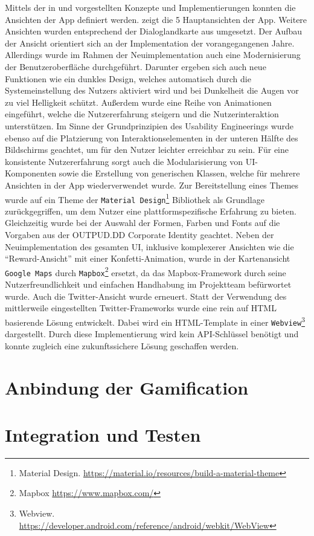 Mittels der in  und  vorgestellten Konzepte und Implementierungen konnten die Ansichten der App definiert werden.  zeigt die 5 Hauptansichten der App. Weitere Ansichten wurden entsprechend der Dialoglandkarte aus  umgesetzt. Der Aufbau der Ansicht orientiert sich an der Implementation der vorangegangenen Jahre. Allerdings wurde im Rahmen der Neuimplementation auch eine Modernisierung der Benutzeroberfläche durchgeführt. Darunter ergeben sich auch neue Funktionen wie ein dunkles Design, welches automatisch durch die Systemeinstellung des Nutzers aktiviert wird und bei Dunkelheit die Augen vor zu viel Helligkeit schützt. Außerdem wurde eine Reihe von Animationen eingeführt, welche die Nutzererfahrung steigern und die Nutzerinteraktion unterstützen. Im Sinne der Grundprinzipien des Usability Engineerings wurde ebenso auf die Platzierung von Interaktionselementen in der unteren Hälfte des Bildschirms geachtet, um für den Nutzer leichter erreichbar zu sein. Für eine konsistente Nutzererfahrung sorgt auch die Modularisierung von UI-Komponenten sowie die Erstellung von generischen Klassen, welche für mehrere Ansichten in der App wiederverwendet wurde. Zur Bereitstellung eines Themes wurde auf ein Theme der \texttt{Material Design}\footnote{Material Design. \url{https://material.io/resources/build-a-material-theme}} Bibliothek als Grundlage zurückgegriffen, um dem Nutzer eine plattformspezifische Erfahrung zu bieten. Gleichzeitig wurde bei der Auswahl der Formen, Farben und Fonts auf die Vorgaben aus der OUTPUD.DD Corporate Identity geachtet. Neben der Neuimplementation des gesamten UI, inklusive komplexerer Ansichten wie die \enquote{Reward-Ansicht} mit einer Konfetti-Animation, wurde in der Kartenansicht \texttt{Google Maps} durch \texttt{Mapbox}\footnote{Mapbox \url{https://www.mapbox.com/}} ersetzt, da das Mapbox-Framework durch seine Nutzerfreundlichkeit und einfachen Handhabung im Projektteam befürwortet wurde. Auch die Twitter-Ansicht wurde erneuert. Statt der Verwendung des mittlerweile eingestellten Twitter-Frameworks wurde eine rein auf HTML basierende Lösung entwickelt. Dabei wird ein HTML-Template in einer \texttt{Webview}\footnote{Webview. \url{https://developer.android.com/reference/android/webkit/WebView}} dargestellt. Durch diese Implementierung wird kein API-Schlüssel benötigt und konnte zugleich eine zukunftssichere Lösung geschaffen werden.

\newpage

\section{Anbindung der Gamification}

\section{Integration und Testen}
